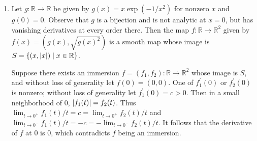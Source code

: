 \documentclass[11pt,leqno]{article}
\theoremstyle{plain}
\theoremstyle{definition}
\numberwithin{equation}{section}
\numberwithin{lem}{section}
\newcommand{\cbr}[1]{\left\{#1\right\}}
\begin{document}
\begin{enumerate}
\begin{enumerate}
    \end{enumerate}
    \item Let $g\colon \mathbb R\to\mathbb R$ be given by $g(x) = x\exp(-1/x^2)$ for nonzero $x$ and $g(0) = 0$. Observe that $g$ is a bijection and is not analytic at $x = 0$, but has vanishing derivatives at every order there. Then the map $f\colon\mathbb R\to \mathbb R^2$ given by $f(x) = (g(x),\sqrt{g(x)^2})$ is a smooth map whose image is $S = \cbr{(x,\abs{x})\mid x\in\mathbb R}$. 
    
    Suppose there exists an immersion $f = (f_1,f_2) \colon \mathbb R\to\mathbb R^2$ whose image is $S$, and without loss of generality let $f(0) = (0,0)$. One of $f_1^\prime(0)$ or $f_2^\prime(0)$ is nonzero; without loss of generality let $f_1^\prime(0) = c > 0$. Then in a small neighborhood of $0$, $\abs{f_1(t)} = f_2(t)$. Thus $\lim_{t\to 0^+} f_1(t)/t = c = \lim_{t\to 0^+} f_2(t)/t$ and $\lim_{t\to 0^-} f_1(t)/t = -c = -\lim_{t\to 0^-} f_2(t)/t$. It follows that the derivative of $f$ at $0$ is $0$, which contradicts $f$ being an immersion.
\end{enumerate}
\end{document}

